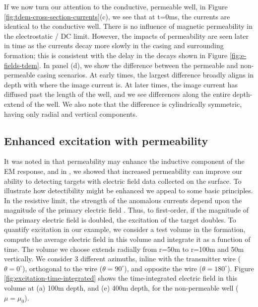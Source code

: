 \documentclass[onecolumn, extra, mreferee]{gji}
\begin{document}


If we now turn our attention to the conductive, permeable well, in Figure \ref{fig:tdem-cross-section-currents}(c), we see that at t=0ms, the currents are identical to the conductive well. There is no influence of magnetic permeability in the electrostatic / DC limit. However, the impacts of permeability are seen later in time as the currents decay more slowly in the casing and surrounding formation; this is consistent with the delay in the decays shown in Figure \ref{fig:e-fields-tdem}. In panel (d), we show the difference between the permeable and non-permeable casing scenarios. At early times, the largest difference broadly aligns in depth with where the image current is. At later times, the image current has diffused past the length of the well, and we see differences along the entire depth-extend of the well. We also note that the difference is cylindrically symmetric, having only radial and vertical components.

\subsection{Enhanced excitation with permeability}

It was noted in \cite{cuevas_effect_2018} that permeability may enhance the inductive component of the EM response, and in \cite{heagy_electrical_2022}, we showed that increased permeability can improve our ability to detecting targets with electric field data collected on the surface. To illustrate how detectibility might be enhanced we appeal to some basic principles. In the resistive limit, the strength of the anomalous currents depend upon the magnitude of the primary electric field \citep{west_physics_1991}. Thus, to first-order, if the magnitude of the primary electric field is doubled, the excitation of the target doubles. To quantify excitation in our example, we consider a test volume in the formation, compute the average electric field in this volume and integrate it as a function of time. The volume we choose extends radially from r=50m to r=100m and 50m vertically. We consider 3 different azimuths, inline with the transmitter wire ($\theta = 0^\circ$), orthogonal to the wire ($\theta = 90^\circ$), and opposite the wire ($\theta = 180^\circ$). Figure \ref{fig:excitation-time-integrated} shows the time-integrated electric field in this volume at (a) 100m depth, and (e) 400m depth, for the non-permeable well ($\mu=\mu_0$).
\end{document}
